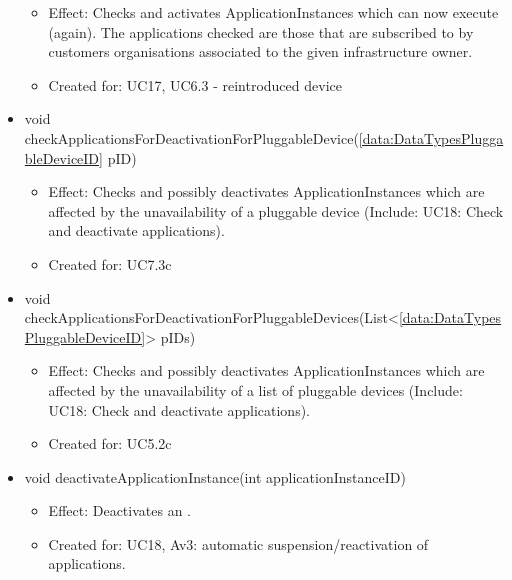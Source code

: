 \begin{description}
\begin{itemize}[noitemsep,nolistsep,leftmargin=-.25cm]
\begin{itemize}[noitemsep,nolistsep]
           \item Effect: Checks and activates ApplicationInstances which can now execute (again). The applications checked are those that are subscribed to by customers organisations associated to the given infrastructure owner.
\item Created for: UC17, UC6.3 - reintroduced device
        \end{itemize}
      \item \textsf{void checkApplicationsForDeactivationForPluggableDevice(\ref{data:DataTypesPluggableDeviceID} pID)}
        \begin{itemize}[noitemsep,nolistsep]
           \item Effect: Checks and possibly deactivates ApplicationInstances which are affected by the unavailability of a pluggable device (Include: UC18: Check and deactivate applications).
\item Created for: UC7.3c
        \end{itemize}
      \item \textsf{void checkApplicationsForDeactivationForPluggableDevices(List\textless{}\ref{data:DataTypesPluggableDeviceID}\textgreater{} pIDs)}
        \begin{itemize}[noitemsep,nolistsep]
           \item Effect: Checks and possibly deactivates ApplicationInstances which are affected by the unavailability of a list of pluggable devices (Include: UC18: Check and deactivate applications).
\item Created for: UC5.2c
        \end{itemize}
      \item \textsf{void deactivateApplicationInstance(int applicationInstanceID)}
        \begin{itemize}[noitemsep,nolistsep]
           \item Effect: Deactivates an .
\item Created for: UC18, Av3: automatic suspension/reactivation of applications.
        \end{itemize}
    \end{itemize}
    \end{description}

